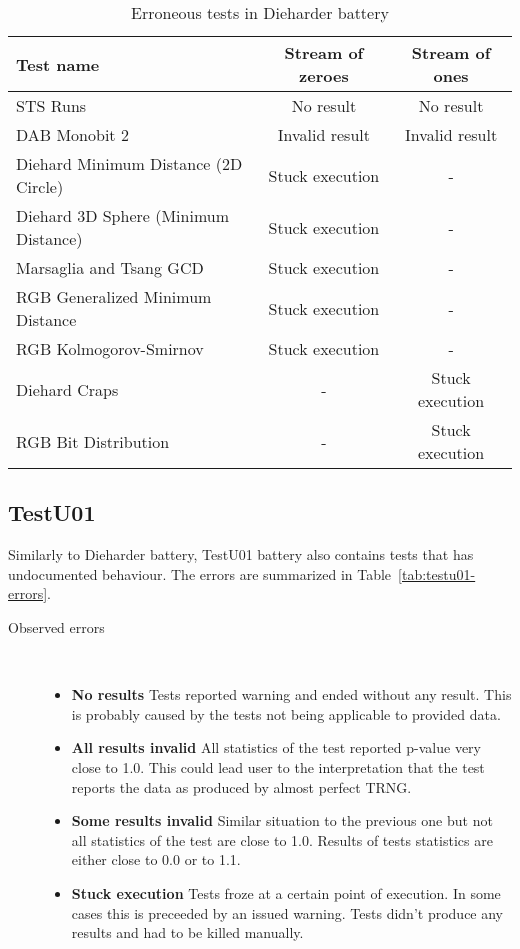 \documentclass[
  digital,  	%
  color,		%
  oneside,   	%
  12pt,
  nocover,
  notable,
  nolof,
  nolot,
]{fithesis3}
\newenvironment{titlemize}[1]
{
	\begin{description}
	\item[#1]\
	\begin{itemize}
}
{
	\end{itemize}
 	\end{description}
}
\begin{document}
\begin{table}[h!]
\begin{nomar}
\centering
\begin{tabular}{ l || c | c }
\textbf{Test name}                   & \textbf{Stream of zeroes} & \textbf{Stream of ones} \\ \hline \hline
STS Runs                             & No result                & No result                \\ \hline
DAB Monobit 2 						 & Invalid result           & Invalid result           \\ \hline
Diehard Minimum Distance (2D Circle) & Stuck execution          & -                        \\
Diehard 3D Sphere (Minimum Distance) & Stuck execution          & -                        \\
Marsaglia and Tsang GCD              & Stuck execution          & -                        \\
RGB Generalized Minimum Distance     & Stuck execution          & -                        \\
RGB Kolmogorov-Smirnov               & Stuck execution          & -                        \\  
Diehard Craps                        & -                        & Stuck execution          \\
RGB Bit Distribution                 & -                        & Stuck execution          \\
\end{tabular}
\end{nomar}
\caption{Erroneous tests in Dieharder battery}
\label{tab:dieharder-errors}
\end{table}

\subsection*{TestU01}
Similarly to Dieharder battery, TestU01 battery also contains tests that has undocumented behaviour. The errors are summarized in Table~\ref{tab:testu01-errors}.

\begin{titlemize}{Observed errors}
\item \textbf{No results} Tests reported warning and ended without any result. This is probably caused by the tests not being applicable to provided data.
\item \textbf{All results invalid}  All statistics of the test reported p-value very close to 1.0. This could lead user to the interpretation that the test reports the data as produced by almost perfect TRNG.
\item \textbf{Some results invalid} Similar situation to the previous one but not all statistics of the test are close to 1.0. Results of tests statistics are either close to 0.0 or to 1.1.
\item \textbf{Stuck execution} Tests froze at a certain point of execution. In some cases this is preceeded by an issued warning. Tests didn't produce any results and had to be killed manually.
\end{titlemize}
\end{document}

